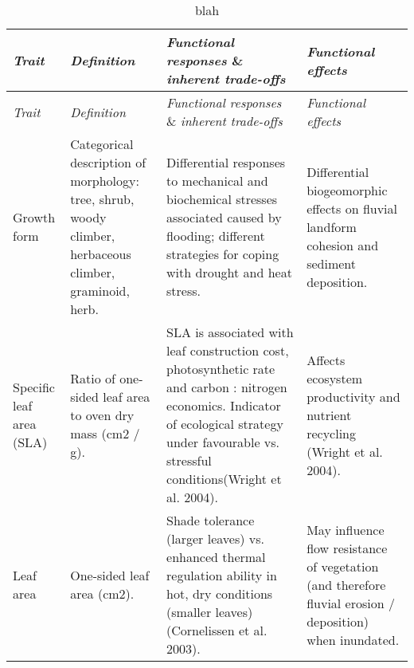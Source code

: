 \documentclass[12pt,a4paper]{memoir}
\begin{document}
\doublespacing



\begin{landscape}
\begin{tiny}
{\tabulinesep=1.2mm
\begin{longtabu} to  
\caption[Blah.]{\tiny{blah}} \\
\toprule
\textit{Trait} & \textit{Definition} & \textit{Functional responses} \& \textit{inherent trade-offs} & \textit{Functional effects} \\ \hline
%
\endfirsthead
%
%
\toprule
\textit{Trait} & \textit{Definition} & \textit{Functional responses} \& \textit{inherent trade-offs} & \textit{Functional effects} \\ \hline
\endhead
%
%
\hline
Growth form & Categorical description of morphology: tree, shrub, woody climber, herbaceous climber, graminoid, herb. & Differential responses to mechanical and biochemical stresses associated caused by flooding; different strategies for coping with drought and heat stress. & Differential biogeomorphic effects on fluvial landform cohesion and sediment deposition. \\ \hline
Specific leaf area (SLA) & Ratio of one-sided leaf area to oven dry mass (cm2 / g). & SLA is associated with leaf construction cost, photosynthetic rate and carbon : nitrogen economics. Indicator of  ecological strategy under favourable vs. stressful conditions(Wright et al. 2004). & Affects ecosystem productivity and nutrient recycling (Wright et al. 2004). \\ \hline
Leaf area & One-sided leaf area (cm2). & Shade tolerance (larger leaves) vs. enhanced thermal regulation ability in hot, dry conditions (smaller leaves) (Cornelissen et al. 2003). & May influence flow resistance of vegetation (and therefore fluvial erosion / deposition) when inundated. \\ \hline

\end{longtabu}}
\end{tiny}
\end{landscape}
\end{document}

